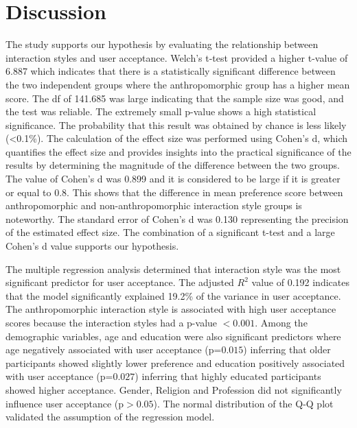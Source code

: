 \documentclass[conference]{IEEEtran}
\begin{document}
  \section{Discussion}
  The study supports our hypothesis by evaluating the relationship between interaction styles and user acceptance. Welch’s t-test provided a higher t-value of 6.887 which indicates that there is a statistically significant difference between the two independent groups where the anthropomorphic group has a higher mean score. The df of 141.685 was large indicating that the sample size was good, and the test was reliable. The extremely small p-value shows a high statistical significance. The probability that this result was obtained by chance is less likely (\textless 0.1\%). The calculation of the effect size was performed using Cohen’s d, which quantifies the effect size and provides insights into the practical significance of the results by determining the magnitude of the difference between the two groups. The value of Cohen’s d was 0.899 and it is considered to be large if it is greater or equal to 0.8. This shows that the difference in mean preference score between anthropomorphic and non-anthropomorphic interaction style groups is noteworthy. The standard error of Cohen’s d was 0.130 representing the precision of the estimated effect size. The combination of a significant t-test and a large Cohen’s d value supports our hypothesis. \par
  The multiple regression analysis determined that interaction style was the most significant predictor for user acceptance. The adjusted $R^2$ value of 0.192 indicates that the model significantly explained 19.2\% of the variance in user acceptance. The anthropomorphic interaction style is associated with high user acceptance scores because the interaction styles had a p-value $< 0.001$. Among the demographic variables, age and education were also significant predictors where age negatively associated with user acceptance (p=$0.015$) inferring that older participants showed slightly lower preference and education positively associated with user acceptance (p=$0.027$) inferring that highly educated participants showed higher acceptance. Gender, Religion and Profession did not significantly influence user acceptance (p$>0.05$). The normal distribution of the Q-Q plot validated the assumption of the regression model.      
  
\end{document}
